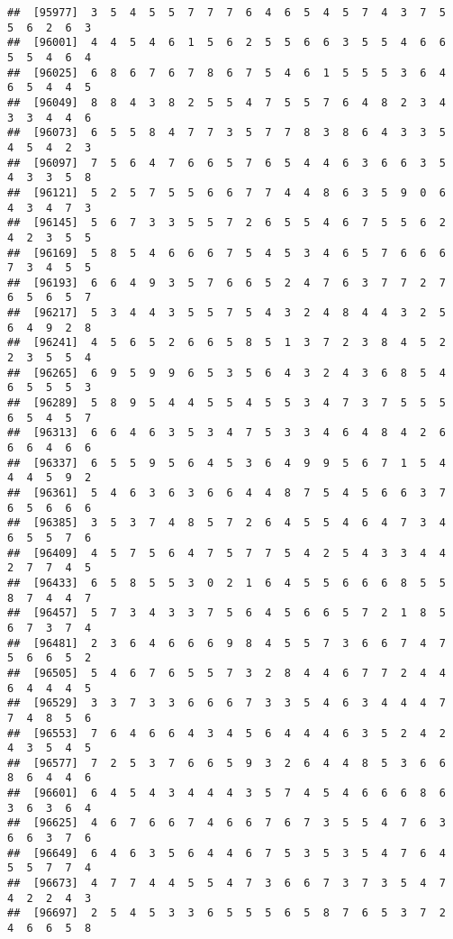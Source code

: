 \documentclass[
]{book}
\begin{document}
\begin{verbatim}
##  [95977]  3  5  4  5  5  7  7  7  6  4  6  5  4  5  7  4  3  7  5  5  6  2  6  3
##  [96001]  4  4  5  4  6  1  5  6  2  5  5  6  6  3  5  5  4  6  6  5  5  4  6  4
##  [96025]  6  8  6  7  6  7  8  6  7  5  4  6  1  5  5  5  3  6  4  6  5  4  4  5
##  [96049]  8  8  4  3  8  2  5  5  4  7  5  5  7  6  4  8  2  3  4  3  3  4  4  6
##  [96073]  6  5  5  8  4  7  7  3  5  7  7  8  3  8  6  4  3  3  5  4  5  4  2  3
##  [96097]  7  5  6  4  7  6  6  5  7  6  5  4  4  6  3  6  6  3  5  4  3  3  5  8
##  [96121]  5  2  5  7  5  5  6  6  7  7  4  4  8  6  3  5  9  0  6  4  3  4  7  3
##  [96145]  5  6  7  3  3  5  5  7  2  6  5  5  4  6  7  5  5  6  2  4  2  3  5  5
##  [96169]  5  8  5  4  6  6  6  7  5  4  5  3  4  6  5  7  6  6  6  7  3  4  5  5
##  [96193]  6  6  4  9  3  5  7  6  6  5  2  4  7  6  3  7  7  2  7  6  5  6  5  7
##  [96217]  5  3  4  4  3  5  5  7  5  4  3  2  4  8  4  4  3  2  5  6  4  9  2  8
##  [96241]  4  5  6  5  2  6  6  5  8  5  1  3  7  2  3  8  4  5  2  2  3  5  5  4
##  [96265]  6  9  5  9  9  6  5  3  5  6  4  3  2  4  3  6  8  5  4  6  5  5  5  3
##  [96289]  5  8  9  5  4  4  5  5  4  5  5  3  4  7  3  7  5  5  5  6  5  4  5  7
##  [96313]  6  6  4  6  3  5  3  4  7  5  3  3  4  6  4  8  4  2  6  6  6  4  6  6
##  [96337]  6  5  5  9  5  6  4  5  3  6  4  9  9  5  6  7  1  5  4  4  4  5  9  2
##  [96361]  5  4  6  3  6  3  6  6  4  4  8  7  5  4  5  6  6  3  7  6  5  6  6  6
##  [96385]  3  5  3  7  4  8  5  7  2  6  4  5  5  4  6  4  7  3  4  6  5  5  7  6
##  [96409]  4  5  7  5  6  4  7  5  7  7  5  4  2  5  4  3  3  4  4  2  7  7  4  5
##  [96433]  6  5  8  5  5  3  0  2  1  6  4  5  5  6  6  6  8  5  5  8  7  4  4  7
##  [96457]  5  7  3  4  3  3  7  5  6  4  5  6  6  5  7  2  1  8  5  6  7  3  7  4
##  [96481]  2  3  6  4  6  6  6  9  8  4  5  5  7  3  6  6  7  4  7  5  6  6  5  2
##  [96505]  5  4  6  7  6  5  5  7  3  2  8  4  4  6  7  7  2  4  4  6  4  4  4  5
##  [96529]  3  3  7  3  3  6  6  6  7  3  3  5  4  6  3  4  4  4  7  7  4  8  5  6
##  [96553]  7  6  4  6  6  4  3  4  5  6  4  4  4  6  3  5  2  4  2  4  3  5  4  5
##  [96577]  7  2  5  3  7  6  6  5  9  3  2  6  4  4  8  5  3  6  6  8  6  4  4  6
##  [96601]  6  4  5  4  3  4  4  4  3  5  7  4  5  4  6  6  6  8  6  3  6  3  6  4
##  [96625]  4  6  7  6  6  7  4  6  6  7  6  7  3  5  5  4  7  6  3  6  6  3  7  6
##  [96649]  6  4  6  3  5  6  4  4  6  7  5  3  5  3  5  4  7  6  4  5  5  7  7  4
##  [96673]  4  7  7  4  4  5  5  4  7  3  6  6  7  3  7  3  5  4  7  4  2  2  4  3
##  [96697]  2  5  4  5  3  3  6  5  5  5  6  5  8  7  6  5  3  7  2  4  6  6  5  8

\end{verbatim}
\end{document}
